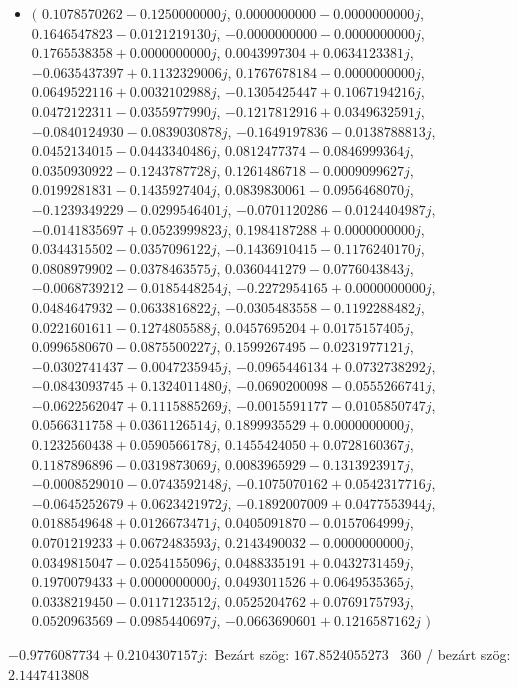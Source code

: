 \documentclass[14pt,a4paper]{article}
\begin{document}
\begin{itemize}
\item
$\big($
$0.1078570262-0.1250000000j$, $0.0000000000-0.0000000000j$, $0.1646547823-0.0121219130j$, $-0.0000000000-0.0000000000j$, $0.1765538358+0.0000000000j$, $0.0043997304+0.0634123381j$, $-0.0635437397+0.1132329006j$, $0.1767678184-0.0000000000j$, $0.0649522116+0.0032102988j$, $-0.1305425447+0.1067194216j$, $0.0472122311-0.0355977990j$, $-0.1217812916+0.0349632591j$, $-0.0840124930-0.0839030878j$, $-0.1649197836-0.0138788813j$, $0.0452134015-0.0443340486j$, $0.0812477374-0.0846999364j$, $0.0350930922-0.1243787728j$, $0.1261486718-0.0009099627j$, $0.0199281831-0.1435927404j$, $0.0839830061-0.0956468070j$, $-0.1239349229-0.0299546401j$, $-0.0701120286-0.0124404987j$, $-0.0141835697+0.0523999823j$, $0.1984187288+0.0000000000j$, $0.0344315502-0.0357096122j$, $-0.1436910415-0.1176240170j$, $0.0808979902-0.0378463575j$, $0.0360441279-0.0776043843j$, $-0.0068739212-0.0185448254j$, $-0.2272954165+0.0000000000j$, $0.0484647932-0.0633816822j$, $-0.0305483558-0.1192288482j$, $0.0221601611-0.1274805588j$, $0.0457695204+0.0175157405j$, $0.0996580670-0.0875500227j$, $0.1599267495-0.0231977121j$, $-0.0302741437-0.0047235945j$, $-0.0965446134+0.0732738292j$, $-0.0843093745+0.1324011480j$, $-0.0690200098-0.0555266741j$, $-0.0622562047+0.1115885269j$, $-0.0015591177-0.0105850747j$, $0.0566311758+0.0361126514j$, $0.1899935529+0.0000000000j$, $0.1232560438+0.0590566178j$, $0.1455424050+0.0728160367j$, $0.1187896896-0.0319873069j$, $0.0083965929-0.1313923917j$, $-0.0008529010-0.0743592148j$, $-0.1075070162+0.0542317716j$, $-0.0645252679+0.0623421972j$, $-0.1892007009+0.0477553944j$, $0.0188549648+0.0126673471j$, $0.0405091870-0.0157064999j$, $0.0701219233+0.0672483593j$, $0.2143490032-0.0000000000j$, $0.0349815047-0.0254155096j$, $0.0488335191+0.0432731459j$, $0.1970079433+0.0000000000j$, $0.0493011526+0.0649535365j$, $0.0338219450-0.0117123512j$, $0.0525204762+0.0769175793j$, $0.0520963569-0.0985440697j$, $-0.0663690601+0.1216587162j$
$\big)$
\end{itemize}
$-0.9776087734+0.2104307157j$:\
Bezárt szög: $167.8524055273$ \
360 / bezárt szög: $2.1447413808$\
\end{document}
